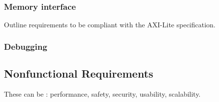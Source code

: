 \subsubsection{Memory interface}
\label{spec-memory-interface}


\begin{content}
  Outline requirements to be compliant with the AXI-Lite specification.
\end{content}

\subsubsection{Debugging}

\subsection{Nonfunctional Requirements}



\begin{content}
These can be : performance, safety, security, usability, scalability.
\end{content}

\newpage
